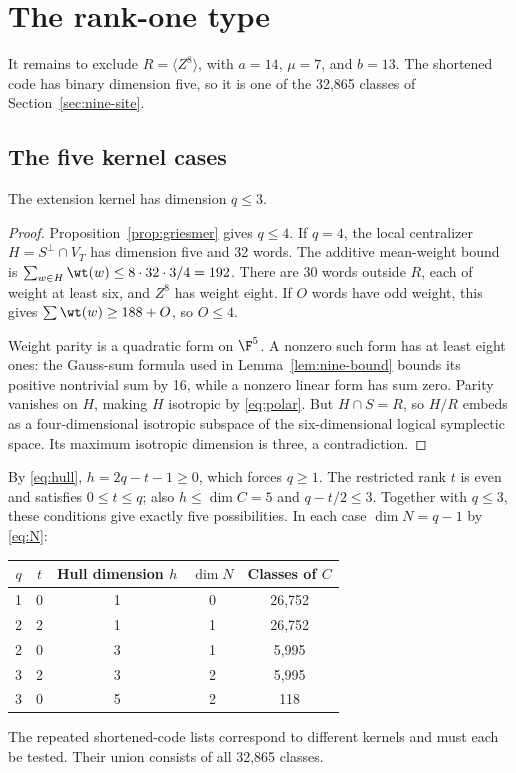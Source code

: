 \section{The rank-one type}\label{sec:rank-one}

It remains to exclude \(R=\langle Z^8\rangle\), with \(a=14\),
\(\mu=7\), and \(b=13\). The shortened code has binary dimension five,
so it is one of the 32,865 classes of Section~\ref{sec:nine-site}.

\subsection{The five kernel cases}

\begin{lemma}\label{lem:qthree}
The extension kernel has dimension \(q\leq3\).
\end{lemma}
\begin{proof}
Proposition~\ref{prop:griesmer} gives \(q\leq4\). If \(q=4\), the
local centralizer \(H=S^\perp\cap V_T\) has dimension five and
32 words. The additive mean-weight bound is
\(\sum_{w\in H}\wt(w)\leq8\cdot32\cdot3/4=192\).
There are 30 words outside \(R\), each of weight at least six, and
\(Z^8\) has weight eight. If \(O\) words have odd weight, this gives
\(\sum\wt(w)\geq188+O\), so \(O\leq4\).

Weight parity is a quadratic form on \(\F^5\). A nonzero such form
has at least eight ones: the Gauss-sum formula used in
Lemma~\ref{lem:nine-bound} bounds its positive nontrivial sum by 16,
while a nonzero linear form has sum zero. Parity vanishes on
\(H\), making \(H\) isotropic by \eqref{eq:polar}.
But \(H\cap S=R\), so \(H/R\) embeds as a four-dimensional
isotropic subspace of the six-dimensional logical symplectic space.
Its maximum isotropic dimension is three, a contradiction.
\end{proof}

By \eqref{eq:hull}, \(h=2q-t-1\geq0\), which forces \(q\geq1\). The restricted rank
\(t\) is even and satisfies \(0\leq t\leq q\); also
\(h\leq\dim C=5\) and \(q-t/2\leq3\).
Together with \(q\leq3\), these conditions give exactly five possibilities.
In each case \(\dim N=q-1\) by \eqref{eq:N}:
\begin{center}
\begin{tabular}{@{}ccccc@{}}\toprule
\(q\)&\(t\)&Hull dimension \(h\)&\(\dim N\)&Classes of \(C\)\\\midrule
1&0&1&0&26,752\\
2&2&1&1&26,752\\
2&0&3&1&5,995\\
3&2&3&2&5,995\\
3&0&5&2&118\\\bottomrule
\end{tabular}
\end{center}
The repeated shortened-code lists correspond to different kernels and
must each be tested. Their union consists of all 32,865 classes.

